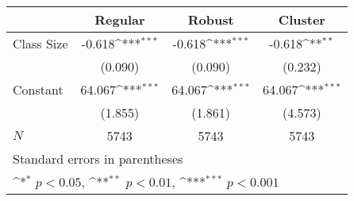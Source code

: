 {
\def\sym#1{\ifmmode^{#1}\else\(^{#1}\)\fi}
\begin{tabular}{l*{3}{c}}
\hline\hline
            &\multicolumn{1}{c}{Regular}&\multicolumn{1}{c}{Robust}&\multicolumn{1}{c}{Cluster}\\
\hline
Class Size  &      -0.618\sym{***}&      -0.618\sym{***}&      -0.618\sym{**} \\
            &     (0.090)         &     (0.090)         &     (0.232)         \\
[1em]
Constant    &      64.067\sym{***}&      64.067\sym{***}&      64.067\sym{***}\\
            &     (1.855)         &     (1.861)         &     (4.573)         \\
\hline
\(N\)       &        5743         &        5743         &        5743         \\
\hline\hline
\multicolumn{4}{l}{\footnotesize Standard errors in parentheses}\\
\multicolumn{4}{l}{\footnotesize \sym{*} \(p<0.05\), \sym{**} \(p<0.01\), \sym{***} \(p<0.001\)}\\
\end{tabular}
}
